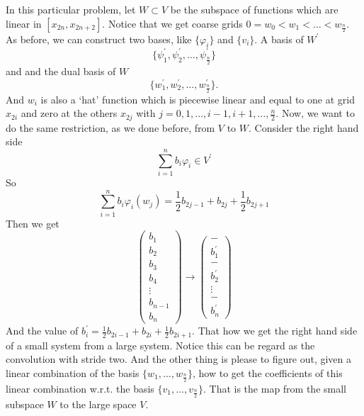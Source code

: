 In this particular problem, let $W\subset V$ be the subspace of functions which are linear in $[x_{2n}, x_{2n+2}]$. Notice that we get coarse grids $0=w_0 <w_1< \ldots <w_{\frac{n}{2}}$. As before, we can construct two bases, like $\{\varphi_i\}$ and $\{v_i\}$. A basis of $W^\prime$
\begin{equation}
\{ \psi_1^\prime, \psi_2^\prime, \ldots, \psi_{\frac{n}{2}}^\prime\}
\end{equation}
and and the dual basis of $W$  
\begin{equation}
\{ w_1^\prime, w_2^\prime, \ldots, w_{\frac{n}{2}}^\prime\}.
\end{equation}
And $w_i$ is also a `hat' function which is piecewise linear and equal to one at grid $x_{2i}$ and zero at the others $x_{2j}$ with $j=0,1,\ldots,i-1,i+1,\ldots, \frac{n}{2}$. 
Now, we want to do the same restriction, as we done before, from $V$ to $W$.
Consider the right hand side 
\begin{equation}
\sum_{i=1}^{n} b_i \varphi_i \in V^\prime
\end{equation}
So 
\begin{equation} 
\sum_{i=1}^{n} b_i \varphi_i (w_j) = \frac{1}{2} b_{2j-1} + b_{2j} +\frac{1}{2} b_{2j+1}
\end{equation}
Then we get
\begin{equation}
\left(
	\begin{array}{c}
	b_1\\ b_2 \\ b_3 \\b_4 \\ 
	\vdots \\ b_{n-1} \\b_n
	\end{array} \right) 
\to
\left(
	\begin{array}{c}
	- \\
	b^\prime_1\\
	- \\
	 b_2^\prime \\
	\vdots \\- \\ b^\prime_n
	\end{array} \right) 
\end{equation}
And the value of $b_i^\prime = \frac{1}{2} b_{2i-1} + b_{2i} + \frac{1}{2} b_{2i+1}$. That how we get the right hand side of a small system from a large system. Notice this can be regard as the convolution with stride two. And the other thing is please to figure out, given a linear combination of the basis $\{w_1,\ldots, w_{\frac{n}{2}}\}$, how to get the coefficients of this linear combination w.r.t. the basis $\{v_1,\ldots, v_{\frac{n}{2}}\}$. That is the map from the small subspace $W$ to the large space $V$.
